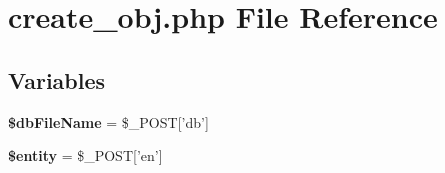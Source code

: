 \hypertarget{create__obj_8php}{\section{create\-\_\-obj.\-php File Reference}
\label{create__obj_8php}
}
\subsection*{Variables}
\begin{DoxyCompactItemize}
\item 
\hypertarget{create__obj_8php_ab20da318c11da52be7a0bd751aa80ba2}{{\bfseries \$db\-File\-Name} = \$\-\_\-\-P\-O\-S\-T\mbox{[}'db'\mbox{]}}\label{create__obj_8php_ab20da318c11da52be7a0bd751aa80ba2}

\item 
\hypertarget{create__obj_8php_a74ed34e6d7bc9f3f8c4fb58a12247ee2}{{\bfseries \$entity} = \$\-\_\-\-P\-O\-S\-T\mbox{[}'en'\mbox{]}}\label{create__obj_8php_a74ed34e6d7bc9f3f8c4fb58a12247ee2}

\end{DoxyCompactItemize}
